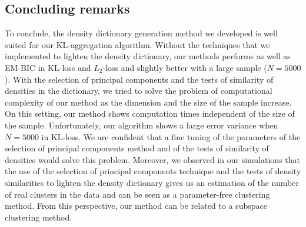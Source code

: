 \subsection{Concluding remarks}
To conclude, the density dictionary generation method we developed is well suited for our KL-aggregation algorithm. Without the techniques that we implemented to lighten the density dictionary, our methods performs as well as EM-BIC in KL-loss and $L_2$-loss and slightly better with a large sample ($N=5000$). With the selection of principal components and the tests of similarity of densities in the dictionary, we tried to solve the problem of computational complexity of our method as the dimension and the size of the sample increase. On this setting, our method shows computation times independent of the size of the sample. Unfortunately, our algorithm shows a large error variance when $N=5000$ in KL-loss.  We are confident that a fine tuning of the parameters of the selection of principal components method and of the tests of similarity of densities would solve this problem.
Moreover, we observed in our simulations that the use of the selection of principal components technique and the tests of density similarities  to lighten the density dictionary gives us an estimation of the number of real clusters in the data and can be seen as a parameter-free clustering method. From this perspective, our method can be related to a subspace clustering method.